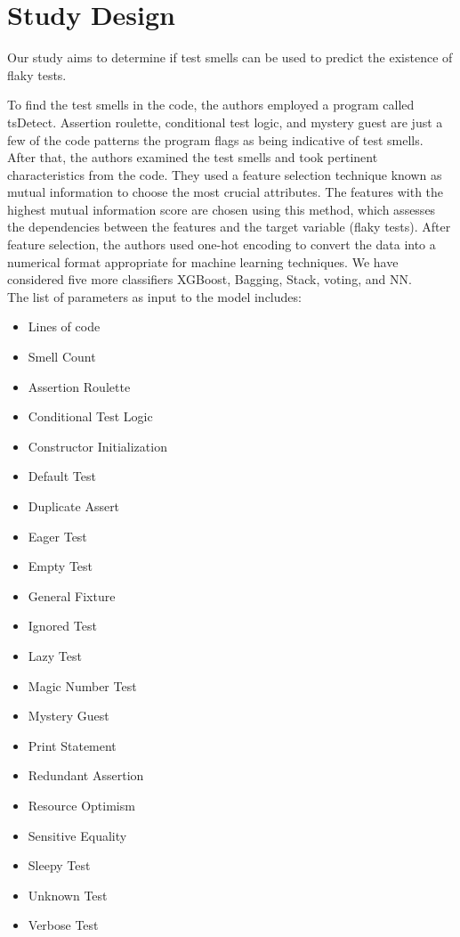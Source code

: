\documentclass[sigconf,review]{acmart}
\begin{document}
 \section{Study Design}
 \label{Section: Methodology} 
Our study aims to determine if test smells can be used to predict the existence of flaky tests. 

To find the test smells in the code, the authors employed a program called tsDetect\cite{r6}. Assertion roulette, conditional test logic, and mystery guest are just a few of the code patterns the program flags as being indicative of test smells. After that, the authors examined the test smells and took pertinent characteristics from the code. They used a feature selection technique known as mutual information to choose the most crucial attributes. The features with the highest mutual information score are chosen using this method, which assesses the dependencies between the features and the target variable (flaky tests). After feature selection, the authors used one-hot encoding to convert the data into a numerical format appropriate for machine learning techniques. We have considered five more classifiers XGBoost, Bagging, Stack, voting, and NN.
\\
The list of parameters as input to the model includes\cite{r6}:
\begin{itemize}
    \item Lines of code
    \item Smell Count
    \item Assertion Roulette
    \item Conditional Test Logic
    \item Constructor Initialization
    \item Default Test
    \item Duplicate Assert
    \item Eager Test
    \item Empty Test
    \item General Fixture
    \item Ignored Test
    \item Lazy Test
    \item Magic Number Test
    \item Mystery Guest
    \item Print Statement
    \item Redundant Assertion
    \item Resource Optimism
    \item Sensitive Equality
    \item Sleepy Test
    \item Unknown Test
    \item Verbose Test
\end{itemize}
\end{document}
